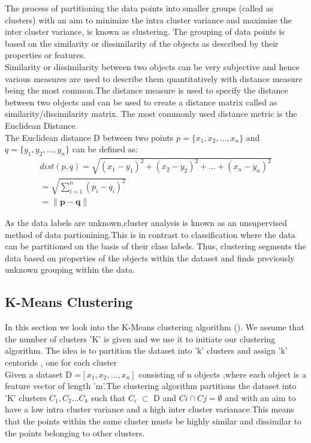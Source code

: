 The process of partitioning the data points into smaller groups (called as clusters) with an aim to minimize the intra cluster variance and maximize the inter cluster variance, is known as clustering. The grouping of data points is based on the similarity or dissimilarity of the objects as described by their properties or features.\\

Similarity or dissimilarity between two objects can be very subjective and hence various measures are used to describe them quantitatively with distance measure being the most common.The distance measure is used to specify the distance between two objects and can be used to create a distance matrix called as similarity/dissimilarity matrix. The most commonly used distance metric is the Euclidean Distance.\\

The Euclidean distance D between two points $p =\{x_1, x_2, ... , x_n\}$ and $q =\{y_1, y_2, ... , y_n\}$ can be defined as:
\begin{equation}\label{eq: Euclidean dist}
\begin{split}
dist(p,q) =  \sqrt{(x_1 - y_1)^2 + (x_2 - y_2)^2 + ... +(x_n - y_n)^2 } \\
=  \sqrt{\sum_{i=1}^{n}(p_i - q_i)^2} \\
= \lVert \mathbf{p-q} \rVert
\end{split}
\end{equation}

As the data labels are unknown,cluster analysis is known as an unsupervised method of data partionining.This is in contrast to classification where the data can be partitioned on the basis of their class labels. Thus, clustering segments the data based on properties of the objects within the dataset and finds previously unknown grouping within the data.

\subsection{K-Means Clustering}\label{sec:kmeans}
In this section we look into the K-Means clustering algorithm (\citet{macqueen1967some}). We assume that the number of clusters 'K' is given and we use it to initiate our clustering algorithm. The idea is to partition the dataset into 'k' clusters and assign 'k' centorids , one for each cluster \\

Given a dataset D =$[x_1,x_2,...,x_n]$ consisting of n objects ,where each object is a feature vector of length 'm'.The clustering algorithm partitions the dataset into 'K' clusters $C_1,C_2...C_k$ such that $C_i$ $\subset$ D and $Ci \cap Cj = \emptyset$ and with an aim to have a low intra cluster variance and a high inter cluster varianace.This means that the points within the same cluster musts be highly similar and dissimilar to the points belonging to other clusters.\\

